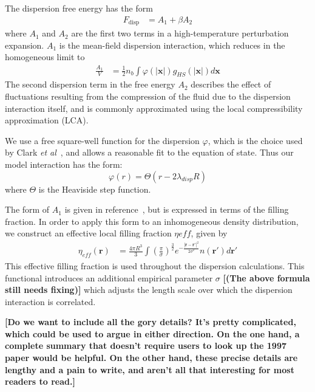 \documentclass[letterpaper,twocolumn,amsmath,amssymb,prb]{revtex4-1}
\newcommand{\red}[1]{{\bf \color{red} #1}}
\newcommand{\xx}{\textbf{x}}
\newcommand{\fixme}[1]{\red{[#1]}}
\begin{document}
The dispersion free energy has the form~\cite{gil-villegas-1997-SAFT-VR}
\begin{align}
  F_\text{disp} &= A_1 + \beta A_2
\end{align}
where $A_1$ and $A_2$ are the first two terms in a high-temperature
perturbation expansion.  $A_1$ is the mean-field dispersion
interaction, which reduces in the homogeneous limit to
\begin{align}
  \frac{A_1}{V} &= \frac12 n_b \int \varphi(\left|\xx\right|)
  g_{HS}(\left|\xx\right|) d\xx
\end{align}
The second dispersion term in the free energy $A_2$ describes the
effect of fluctuations resulting from the compression of the fluid due
to the dispersion interaction itself, and is commonly approximated
using the local compressibility approximation (LCA).

We use a free square-well function for the dispersion $\varphi$, which
is the choice used by Clark \emph{et al}~\cite{clark2006developing},
and allows a reasonable fit to the equation of state.  Thus our model
interaction has the form:
\begin{equation}
  \varphi(r) = \Theta(r-2 \lambda_\textit{disp} R)
\end{equation}
where $\Theta$ is the Heaviside step function.

The form of $A_1$ is given in
reference~\cite{gil-villegas-1997-SAFT-VR}, but is expressed in terms
of the filling fraction.  In order to apply this form to an
inhomogeneous density distribution, we construct an effective local
filling fraction $\eta{\textit{eff}}$, given by
\begin{align}
  \eta_{\textit{eff}}(\mathbf{r}) &= \frac{4\pi R^3}{3}
  \int \left(\frac{\pi}{\sigma}\right)^{\frac32}
  e^{-\frac{|\mathbf{r}-\mathbf{r}'|^2}{2\sigma^2}} n(\mathbf{r}') d\mathbf{r}'
\end{align}
This effective filling fraction is used throughout the dispersion
calculations.  This functional introduces an additional empirical
parameter $\sigma$ \fixme{(The above formula still needs fixing)}
which adjusts the length scale over which the dispersion interaction
is correlated.

\fixme{Do we want to include all the gory details? It's pretty
  complicated, which could be used to argue in either direction.  On
  the one hand, a complete summary that doesn't require users to look
  up the 1997 paper would be helpful.  On the other hand, these
  precise details are lengthy and a pain to write, and aren't all that
  interesting for most readers to read.}
\end{document}
